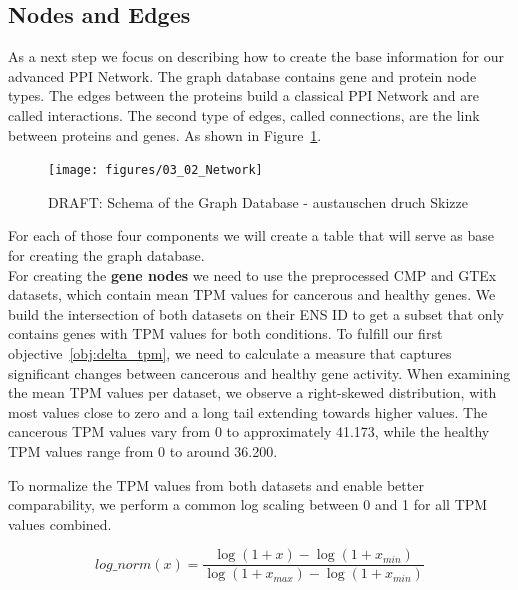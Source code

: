 \subsection{Nodes and Edges} \label{subsec:nodes_and_edges}

As a next step we focus on describing how to create the base information for our advanced PPI Network.
The graph database contains gene and protein node types.
The edges between the proteins build a classical PPI Network and are called interactions. %
The second type of edges, called connections, are the link between proteins and genes.
As shown in Figure~\ref{fig:03_02_Network}.

\begin{figure}[h]
    \centering
    \texttt{[image: figures/03\_02\_Network]}
    \caption{DRAFT: Schema of the Graph Database - austauschen druch Skizze}
    \label{fig:03_02_Network}
\end{figure}

For each of those four components we will create a table that will serve as base for creating the graph database.\\

For creating the \textbf{gene nodes} we need to use the preprocessed CMP and GTEx datasets,
which contain mean TPM values for cancerous and healthy genes.
We build the intersection of both datasets on their ENS ID to get a subset that only contains genes with TPM values for both conditions.
To fulfill our first objective~\ref{obj:delta_tpm},
we need to calculate a measure that captures significant changes between cancerous and healthy gene activity.
When examining the mean TPM values per dataset, we observe a right-skewed distribution, with most values close to zero
and a long tail extending towards higher values.
The cancerous TPM values vary from 0 to approximately 41.173, while the healthy TPM values range from 0 to around 36.200.



To normalize the TPM values from both datasets and enable better comparability, we perform a common log scaling between 0 and 1 for all TPM values combined.

\begin{equation}
\label{eq:tpm_normalization}
log\_norm(x) = \frac{\log(1 + x) - \log(1 + x_{min})}{\log(1 + x_{max}) - \log(1 + x_{min})}
\end{equation}

